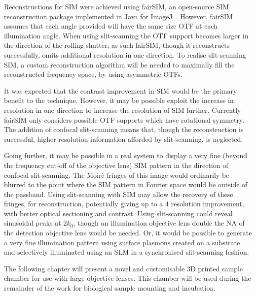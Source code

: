 Reconstructions for \gls{SIM} were achieved using fairSIM, an open-source \gls{SIM} reconstruction package implemented in Java for ImageJ~\cite{mullerOpensourceImageReconstruction2016a}.
However, fairSIM assumes that each angle provided will have the same size \gls{OTF} at each illumination angle.
When using \gls{slit-scanning} the \gls{OTF} support becomes larger in the direction of the rolling shutter; as such fairSIM, though it reconstructs successfully, omits additional resolution in one direction.
To realise \gls{slit-scanning} \gls{SIM}, a custom reconstruction algorithm will be needed to maximally fill the reconstructed frequency space, by using asymmetric \gls{OTF}s.

It was expected that the contrast improvement in \gls{SIM} would be the primary benefit to the technique.
However, it may be possible exploit the increase in resolution in one direction to increase the resolution of \gls{SIM} further.
Currently fairSIM only considers possible OTF supports which have rotational symmetry.
The addition of confocal \gls{slit-scanning} means that, though the reconstruction is successful, higher resolution information afforded by \gls{slit-scanning}, is neglected.

Going further, it may be possible in a real system to display a very fine (beyond the frequency cut-off of the objective lens) \gls{SIM} pattern in the direction of confocal \gls{slit-scanning}.
The Moirè fringes of this image would ordinarily be blurred to the point where the \gls{SIM} pattern in Fourier space would be outside of the passband.
Using \gls{slit-scanning} with \gls{SIM} may allow the recovery of these fringes, for reconstruction, potentially giving up to a \SI{4}{\times} resolution improvement, with better optical sectioning and contrast.
Using slit-scanning could reveal sinusoidal peaks at \(2k_0 \), though an illumination objective lens double the \gls{NA} of the detection objective lens would be needed.
Or, it would be possible to generate a very fine illumination pattern using surface plasmons created on a substrate~\cite{weiPlasmonicStructuredIllumination2010} and selectively illuminated using an \gls{SLM} in a synchronised slit-scanning fashion.

The following chapter will present a novel and customisable 3D printed sample chamber for use with large objective lenses.
This chamber will be used during the remainder of the work for biological sample mounting and incubation.


